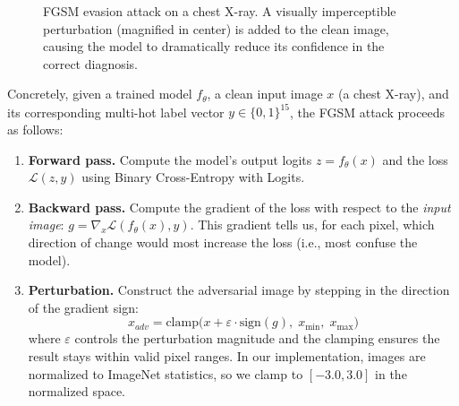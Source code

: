 \documentclass[conference]{IEEEtran}
\begin{document}
\begin{figure}[t]
    \centering
    \caption{FGSM evasion attack on a chest X-ray. A visually imperceptible perturbation (magnified in center) is added to the clean image, causing the model to dramatically reduce its confidence in the correct diagnosis.}
    \label{fig:fgsm_attack}
\end{figure}

Concretely, given a trained model $f_\theta$, a clean input image $x$ (a chest X-ray), and its corresponding multi-hot label vector $y \in \{0, 1\}^{15}$, the FGSM attack proceeds as follows:

\begin{enumerate}[leftmargin=*]
    \item \textbf{Forward pass.} Compute the model's output logits $z = f_\theta(x)$ and the loss $\mathcal{L}(z, y)$ using Binary Cross-Entropy with Logits.
    
    \item \textbf{Backward pass.} Compute the gradient of the loss with respect to the \textit{input image}: $g = \nabla_x \mathcal{L}(f_\theta(x), y)$. This gradient tells us, for each pixel, which direction of change would most increase the loss (i.e., most confuse the model).
    
    \item \textbf{Perturbation.} Construct the adversarial image by stepping in the direction of the gradient sign:
    \begin{equation}
        x_{adv} = \text{clamp}\Big(x + \varepsilon \cdot \text{sign}(g), \; x_{\min}, \; x_{\max}\Big)
        \label{eq:fgsm}
    \end{equation}
    where $\varepsilon$ controls the perturbation magnitude and the clamping ensures the result stays within valid pixel ranges. In our implementation, images are normalized to ImageNet statistics, so we clamp to $[-3.0, 3.0]$ in the normalized space.
\end{enumerate}
\end{document}
